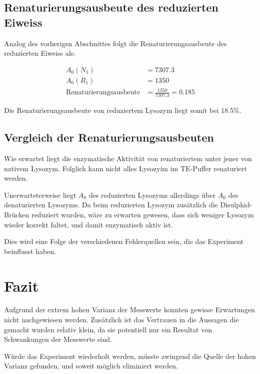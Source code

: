\documentclass[a4paper,german]{scrreprt}
\begin{document}
\section{Renaturierungsausbeute des reduzierten Eiweiss}

Analog des vorherigen Abschnittes folgt die Renaturierungsausbeute des
reduzierten Eiweiss als:

\begin{align*}
	A_0(N_1) & = 7307.3 \\
	A_0(R_1) & = 1350 \\
	\text{Renaturierungsausbeute} & = \frac{1350}{7307.3} = 0.185
\end{align*}

Die Renaturierungsausbeute von reduziertem Lysozym liegt somit bei 18.5\%.

\section{Vergleich der Renaturierungsausbeuten}

Wie erwartet liegt die enzymatische Aktivität von renaturiertem unter jener von
nativem Lysozym. Folglich kann nicht alles Lysozyim im TE-Puffer renaturiert
werden.

Unerwarteterweise liegt $A_0$ des reduzierten Lysozyms allerdings über $A_0$
des denaturierten Lysozyms. Da beim reduzierten Lysozym zusätzlich die
Disulphid-Brücken reduziert wurden, wäre zu erwarten gewesen, dass sich weniger
Lysozym wieder korrekt faltet, und damit enzymatisch aktiv ist.

Dies wird eine Folge der verschiedenen Fehlerquellen sein, die das Experiment
beinflusst haben.

\chapter{Fazit}

Aufgrund der extrem hohen Varianz der Messwerte konnten gewisse Erwartungen
nicht nachgewiesen werden. Zusätzlich ist das Vertrauen in die Aussagen die
gemacht wurden relativ klein, da sie potentiell nur ein Resultat von
Schwankungen der Messwerte sind.

Würde das Experiment wiederholt werden, müsste zwingend die Quelle der hohen
Varianz gefunden, und soweit möglich eliminiert werden.



\end{document}
